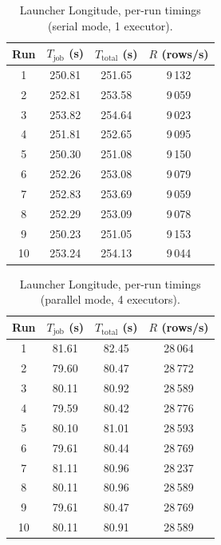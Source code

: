 \begin{table}[htbp]
\centering
\caption{Launcher Longitude, per-run timings (serial mode, 1 executor).}
\label{tab:ll-serial-runs}
\begin{tabular}{cccc}
\toprule
Run & $T_{\text{job}}$ (s) & $T_{\text{total}}$ (s) & $R$ (rows/s) \\
\midrule
1  & 250.81 & 251.65 & 9\,132 \\
2  & 252.81 & 253.58 & 9\,059 \\
3  & 253.82 & 254.64 & 9\,023 \\
4  & 251.81 & 252.65 & 9\,095 \\
5  & 250.30 & 251.08 & 9\,150 \\
6  & 252.26 & 253.08 & 9\,079 \\
7  & 252.83 & 253.69 & 9\,059 \\
8  & 252.29 & 253.09 & 9\,078 \\
9  & 250.23 & 251.05 & 9\,153 \\
10 & 253.24 & 254.13 & 9\,044 \\
\bottomrule
\end{tabular}
\end{table}

\begin{table}[htbp]
\centering
\caption{Launcher Longitude, per-run timings (parallel mode, 4 executors).}
\label{tab:ll-parallel-runs}
\begin{tabular}{cccc}
\toprule
Run & $T_{\text{job}}$ (s) & $T_{\text{total}}$ (s) & $R$ (rows/s) \\
\midrule
1  & 81.61 & 82.45 & 28\,064 \\
2  & 79.60 & 80.47 & 28\,772 \\
3  & 80.11 & 80.92 & 28\,589 \\
4  & 79.59 & 80.42 & 28\,776 \\
5  & 80.10 & 81.01 & 28\,593 \\
6  & 79.61 & 80.44 & 28\,769 \\
7  & 81.11 & 80.96 & 28\,237 \\
8  & 80.11 & 80.96 & 28\,589 \\
9  & 79.61 & 80.47 & 28\,769 \\
10 & 80.11 & 80.91 & 28\,589 \\
\bottomrule
\end{tabular}
\end{table}

